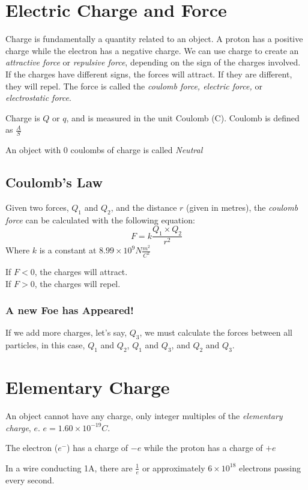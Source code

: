 \documentclass[11pt,twoside]{article}
\begin{document}
	\tableofcontents
	\section{Electric Charge and Force}
		Charge is fundamentally a quantity related to an object. A proton has a positive charge while the electron has a negative charge. We can use charge to create an \emph{attractive force} or \emph{repulsive force}, depending on the sign of the charges involved. If the charges have different signs, the forces will attract. If they are different, they will repel. The force is called the \emph{coulomb force, electric force,} or \emph{electrostatic force}.
		
		Charge is $Q$ or $q$, and is measured in the unit Coulomb (C). Coulomb is defined as $\frac{A}{S}$ 
		
		An object with 0 coulombs of charge is called \emph{Neutral}
		
		\subsection{Coulomb's Law}
			Given two forces, $Q_1$ and $Q_2$, and the distance $r$ (given in metres), the \emph{coulomb force} can be calculated with the following equation:
			\[ F = k \frac{Q_1 \times Q_2}{r^2} \]
			Where $k$ is a constant at $8.99 \times 10^9 N \frac{m^2}{C^2}$
			
			If $F < 0$, the charges will attract. \\ If $F > 0$, the charges will repel.
			
			\subsubsection{A new Foe has Appeared!}
				If we add more charges, let's say, $Q_3$, we must calculate the forces between all particles, in this case, $Q_1$ and $Q_2$, $Q_1$ and $Q_3$, and  $Q_2$ and $Q_3$.
				
	\section{Elementary Charge}
		An object cannot have any charge, only integer multiples of the \emph{elementary charge}, $e$. $e = 1.60 \times 10^{-19} C$.
		
		The electron ($e^-$) has a charge of $-e$ while the proton has a charge of $+e$
		
		In a wire conducting 1A, there are $\frac{1}{e}$ or approximately $6 \times 10^{18}$ electrons passing every second.  
\end{document}
